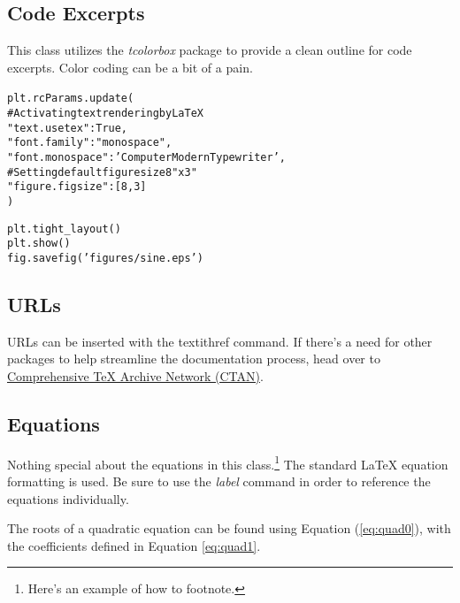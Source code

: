 \documentclass[../main.tex]{subfiles}
\begin{document}
	\subsection{Code Excerpts}
	\label{sec:codeexcerpts}
	
	This class utilizes the \textit{tcolorbox} package to provide a clean outline for code excerpts.  Color coding can be a bit of a pain.
	
	\begin{tcolorbox}[colback=Gray!5!white,colframe=Gray!75!black,title=Enable LaTeX Typesetting in Matplotlib]
		\begin{alltt}
			plt.rcParams.update({
				\textcolor{OliveGreen}{# Activating text rendering by LaTeX}
				"text.usetex": True,
				"font.family": "monospace",
				"font.monospace": 'Computer Modern Typewriter',
				\textcolor{OliveGreen}{# Setting default figure size 8"x3"}
				"figure.figsize": [8,3]
			})
		\end{alltt}
	\end{tcolorbox}
	
	\begin{tcolorbox}[colback=Gray!5!white,colframe=Gray!75!black,title=Export Figure as *.eps]
		\begin{alltt}
			plt.tight_layout()
			plt.show()
			fig.savefig('figures/sine.eps')
		\end{alltt}
	\end{tcolorbox}
	
	
	\subsection{URLs}
	
	URLs can be inserted with the textit{href{}} command.  If there's a need for other packages to help streamline the documentation process, head over to \href{https://ctan.org/}{Comprehensive TeX Archive Network (CTAN)}.
	
	\subsection{Equations}
	
	Nothing special about the equations in this class.\footnote{Here's an example of how to footnote.}  The standard \LaTeX{} equation formatting is used.  Be sure to use the \textit{label{}} command in order to reference the equations individually.
	
	The roots of a quadratic equation can be found using Equation (\ref{eq:quad0}), with the coefficients defined in Equation \ref{eq:quad1}.
	
\end{document}
